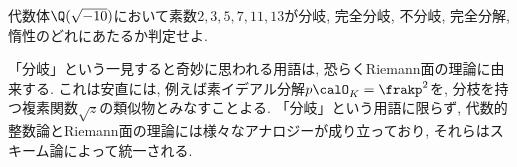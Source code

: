 \documentclass[11pt,b5paper,oneside,titlepage,lualatex]{ltjsreport}
\begin{document}
\begin{exc}{}{}
	代数体$ \Q(\sqrt{-10}) $において素数$ 2, 3, 5, 7, 11, 13 $が分岐, 完全分岐, 不分岐, 完全分解, 惰性のどれにあたるか判定せよ. 
\end{exc}

\begin{rem}{}{}
	「分岐」という一見すると奇妙に思われる用語は, 恐らくRiemann面の理論に由来する. 
	これは安直には, 例えば素イデアル分解$ p \calO_K^{} = \frakp^2 $を, 分枝を持つ複素関数$ \sqrt{z} $の類似物とみなすことよる. 
	「分岐」という用語に限らず, 代数的整数論とRiemann面の理論には様々なアナロジーが成り立っており, それらはスキーム論によって統一される. 
\end{rem}

\clearpage


\chapter{} \label{chap:}






\section{} \label{sec:}





\section{} \label{sec:}





\clearpage






\chapter{} \label{chap:}
\end{document}
